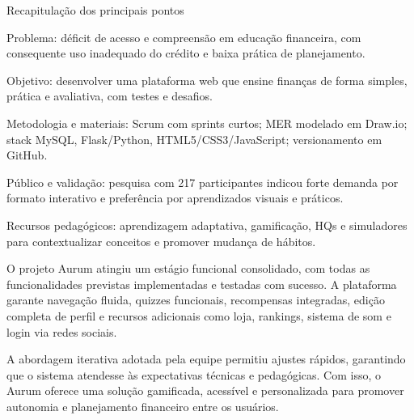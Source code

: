 \documentclass[
	article,			%
	12pt,				%
	oneside,			%
	a4paper,			%
	english,			%
	brazil,				%
	sumario=tradicional
	]{abntex2}
\begin{document}
Recapitulação dos principais pontos

    Problema: déficit de acesso e compreensão em educação financeira, com consequente uso inadequado do crédito e baixa prática de planejamento.

    Objetivo: desenvolver uma plataforma web que ensine finanças de forma simples, prática e avaliativa, com testes e desafios.

    Metodologia e materiais: Scrum com sprints curtos; MER modelado em Draw.io; stack MySQL, Flask/Python, HTML5/CSS3/JavaScript; versionamento em GitHub.

    Público e validação: pesquisa com 217 participantes indicou forte demanda por formato interativo e preferência por aprendizados visuais e práticos.

    Recursos pedagógicos: aprendizagem adaptativa, gamificação, HQs e simuladores para contextualizar conceitos e promover mudança de hábitos.

O projeto Aurum atingiu um estágio funcional consolidado, com todas as funcionalidades previstas implementadas e testadas com sucesso. A plataforma garante navegação fluida, quizzes funcionais, recompensas integradas, edição completa de perfil e recursos adicionais como loja, rankings, sistema de som e login via redes sociais.  

A abordagem iterativa adotada pela equipe permitiu ajustes rápidos, garantindo que o sistema atendesse às expectativas técnicas e pedagógicas. Com isso, o Aurum oferece uma solução gamificada, acessível e personalizada para promover autonomia e planejamento financeiro entre os usuários.





\postextual




%
%

\end{document}
